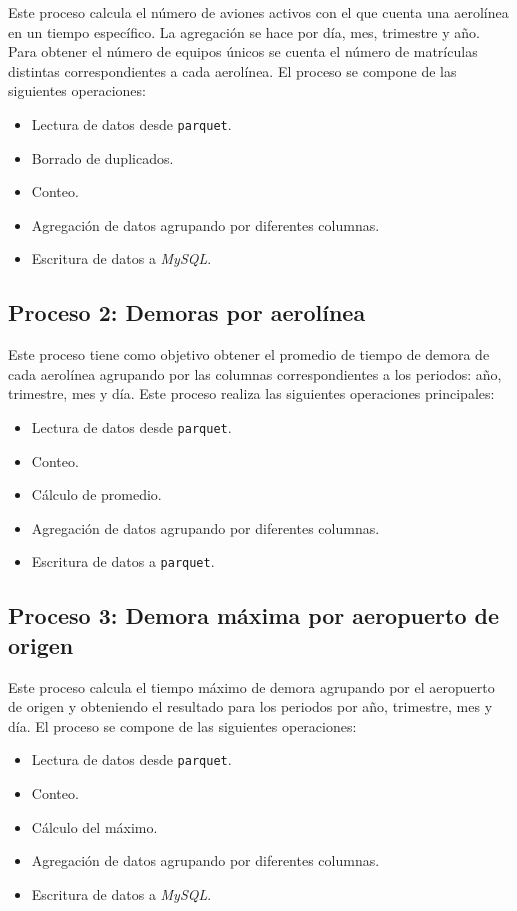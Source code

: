 Este proceso calcula el número de aviones activos con el que cuenta una aerolínea en un tiempo específico. La agregación se hace por día, mes, trimestre y año. Para obtener el número de equipos únicos se cuenta el número de matrículas distintas correspondientes a cada aerolínea. El proceso se compone de las siguientes operaciones:

\begin{itemize}
	\item Lectura de datos desde \texttt{parquet}.
	\item Borrado de duplicados.
	\item Conteo.
	\item Agregación de datos agrupando por diferentes columnas.
	\item Escritura de datos a \textit{MySQL}.
\end{itemize}

\subsection{Proceso 2: Demoras por aerolínea}

Este proceso tiene como objetivo obtener el promedio de tiempo de demora de cada aerolínea agrupando por las columnas correspondientes a los periodos: año, trimestre, mes y día. Este proceso realiza las siguientes operaciones principales:

\begin{itemize}
	\item Lectura de datos desde \texttt{parquet}.
	\item Conteo.
	\item Cálculo de promedio.
	\item Agregación de datos agrupando por diferentes columnas.
	\item Escritura de datos a \texttt{parquet}.
\end{itemize}

\subsection{Proceso 3: Demora máxima por aeropuerto de origen}

Este proceso calcula el tiempo máximo de demora agrupando por el aeropuerto de origen y obteniendo el resultado para los periodos por año, trimestre, mes y día. El proceso se compone de las siguientes operaciones:

\begin{itemize}
	\item Lectura de datos desde \texttt{parquet}.
	\item Conteo.
	\item Cálculo del máximo.
	\item Agregación de datos agrupando por diferentes columnas.
	\item Escritura de datos a \textit{MySQL}.
\end{itemize}

